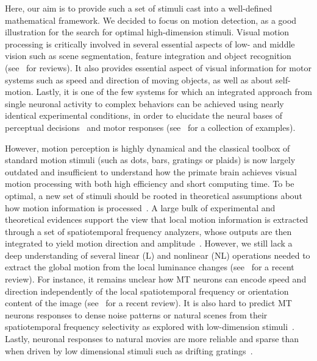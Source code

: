 \documentclass[a4paper,11pt]{article}%
\begin{document}
Here, our aim is to provide such a set of stimuli cast into a well-defined mathematical framework. We decided to focus on motion detection, as a good illustration for the search for optimal high-dimension stimuli. Visual motion processing is critically involved in several essential aspects of low- and middle vision such as scene segmentation, feature integration and object recognition (see~\citep{Braddick93,Bradley08,Burr11} for reviews). It also provides essential aspect of visual information for motor systems such as speed and direction of moving objects, as well as about self-motion. Lastly, it is one of the few systems for which an integrated approach from single neuronal activity to complex behaviors can be achieved using nearly identical experimental conditions, in order to elucidate the neural bases of perceptual decisions~\citep{Newsome97} and motor responses (see~\citep{Masson10a} for a collection of examples). 

However, motion perception is highly dynamical and the classical toolbox of standard motion stimuli (such as dots, bars, gratings or plaids) is now largely outdated and insufficient to understand how the primate brain achieves visual motion processing with both high efficiency and short computing time. To be optimal, a new set of stimuli should be rooted in theoretical assumptions about how motion information is processed~\citep{Watson95}. A large bulk of experimental and theoretical evidences support the view that local motion information is extracted through a set of spatiotemporal frequency analyzers, whose outputs are then integrated to yield motion direction and amplitude~\citep{Adelson85,Simoncelli98}. However, we still lack a deep understanding of several linear (L) and nonlinear (NL) operations needed to extract the global motion from the local luminance changes (see~\citep{Derrington04} for a recent review). For instance, it remains unclear how MT neurons can encode speed and direction independently of the local spatiotemporal frequency or orientation content of the image (see~\citep{Bradley08} for a recent review). It is also hard to predict MT neurons responses to dense noise patterns or natural scenes from their spatiotemporal frequency selectivity as explored with low-dimension stimuli~\citep{Priebe06,Nishimoto11}. Lastly, neuronal responses to natural movies are more reliable and sparse than when driven by low dimensional stimuli such as drifting gratings~\citep{Vinje00}. %
\end{document}
